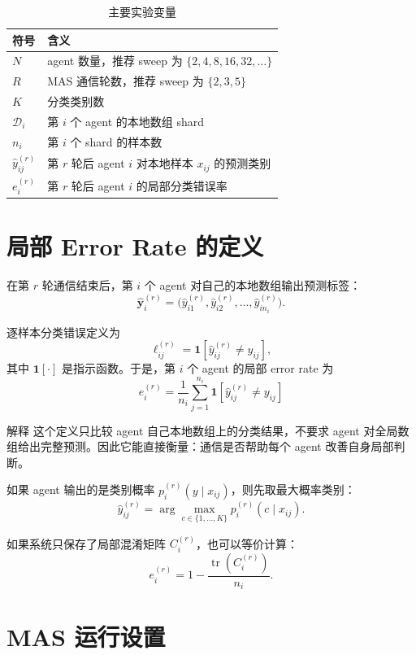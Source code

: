 \documentclass[UTF8,11pt,a4paper,fontset=fandol]{ctexart}
\begin{document}
\begin{table}[h]
\centering
\caption{主要实验变量}
\begin{tabularx}{0.92\linewidth}{>{\bfseries}lX}
\toprule
符号 & 含义 \\
\midrule
\(N\) & agent 数量，推荐 sweep 为 \(\{2,4,8,16,32,\ldots\}\) \\
\(R\) & MAS 通信轮数，推荐 sweep 为 \(\{2,3,5\}\) \\
\(K\) & 分类类别数 \\
\(\mathcal{D}_i\) & 第 \(i\) 个 agent 的本地数组 shard \\
\(n_i\) & 第 \(i\) 个 shard 的样本数 \\
\(\hat{y}_{ij}^{(r)}\) & 第 \(r\) 轮后 agent \(i\) 对本地样本 \(x_{ij}\) 的预测类别 \\
\(e_i^{(r)}\) & 第 \(r\) 轮后 agent \(i\) 的局部分类错误率 \\
\bottomrule
\end{tabularx}
\end{table}

\section{局部 Error Rate 的定义}

在第 \(r\) 轮通信结束后，第 \(i\) 个 agent 对自己的本地数组输出预测标签：
\[
\hat{\mathbf{y}}_{i}^{(r)} =
\bigl(\hat{y}_{i1}^{(r)},\hat{y}_{i2}^{(r)},\ldots,\hat{y}_{in_i}^{(r)}\bigr).
\]

逐样本分类错误定义为
\[
\ell_{ij}^{(r)}
=
\mathbf{1}\!\left[\hat{y}_{ij}^{(r)}\neq y_{ij}\right],
\]
其中 \(\mathbf{1}[\cdot]\) 是指示函数。于是，第 \(i\) 个 agent 的局部 error rate 为
\[
\boxed{
e_i^{(r)}
=
\frac{1}{n_i}\sum_{j=1}^{n_i}
\mathbf{1}\!\left[\hat{y}_{ij}^{(r)}\neq y_{ij}\right]
}
\]

\begin{notebox}{解释}
这个定义只比较 agent 自己本地数组上的分类结果，不要求 agent 对全局数组给出完整预测。因此它能直接衡量：通信是否帮助每个 agent 改善自身局部判断。
\end{notebox}

如果 agent 输出的是类别概率 \(p_i^{(r)}(y\mid x_{ij})\)，则先取最大概率类别：
\[
\hat{y}_{ij}^{(r)}=\arg\max_{c\in\{1,\ldots,K\}} p_i^{(r)}(c\mid x_{ij}).
\]

如果系统只保存了局部混淆矩阵 \(C_i^{(r)}\)，也可以等价计算：
\[
e_i^{(r)}
=
1-\frac{\operatorname{tr}(C_i^{(r)})}{n_i}.
\]

\section{MAS 运行设置}
\end{document}
